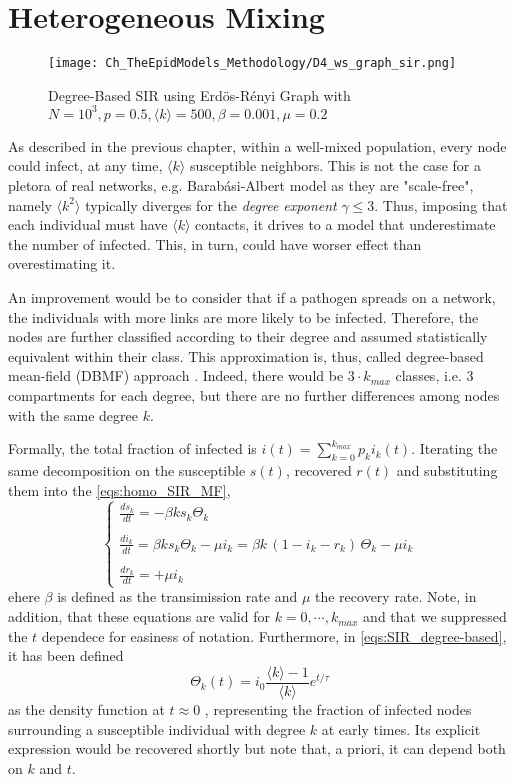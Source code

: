 \documentclass[a4paper,10pt,twoside]{book} %
\theoremstyle{definition}
\begin{document}
\newpage
\section{Heterogeneous Mixing}
\label{sec:degree-basedMF}
\begin{figure}[ht]
	\texttt{[image: Ch\_TheEpidModels\_Methodology/D4\_ws\_graph\_sir.png]}
	\caption{Degree-Based SIR using Erdös-Rényi Graph with $N = 10^{3}, p = 0.5, \langle k \rangle = 500, \beta = 0.001,  \mu = 0.2$}
	\label{fig:DB_SIR}
\end{figure}
As described in the previous chapter, within a well-mixed population, every node could infect, at any time, $\langle k \rangle$ susceptible neighbors. This is not the case for a pletora of real networks, e.g. Barabási-Albert model as they are "scale-free", namely $\langle k^2 \rangle$ typically diverges for the \textit{degree exponent} $\gamma \leq 3$. Thus, imposing that each individual must have $\langle k \rangle$ contacts, it drives to a model that underestimate the number of infected. This, in turn, could have worser effect than overestimating it.

An improvement would be to consider that if a pathogen spreads on a network, the individuals with more links are more likely to be infected. Therefore, the nodes are further classified according to their degree and assumed statistically equivalent within their class. This approximation is, thus, called degree-based mean-field (DBMF) approach \cite{barabasi::2016networkbook}. Indeed, there would be $3 \cdot k_{max}$ classes, i.e. $3$ compartments for each degree, but there are no further differences among nodes with the same degree $k$. 

Formally, the total fraction of infected is $i(t) = \sum_{k=0}^{k_{max}} p_k i_k(t)$. Iterating the same decomposition on the susceptible $ s(t)$, recovered $ r(t)$ and substituting them into the \autoref{eqs:homo_SIR_MF},
\begin{equation}
	\begin{cases}
		\frac{ds_k}{dt} = -\beta  k  s_k \Theta_k \\ \\ 
		\frac{di_k}{dt} = \beta  k  s_k \Theta_k - \mu i_k = \beta  k  \, (1-i_k-r_k) \, \Theta_k -\mu i_k \label{eqs:SIR_degree-based} \\ \\
		\frac{dr_k}{dt} = +\mu i_k
	\end{cases}	
\end{equation}
ehere $ \beta$ is defined as the transimission rate and $ \mu$ the recovery rate.
Note, in addition, that these equations are valid for $k = 0,\cdots,k_{max}$ and that we suppressed the $t$ dependece for easiness of notation.
Furthermore, in \autoref{eqs:SIR_degree-based}, it has been defined
\begin{equation}
	\Theta_k(t) = i_0 \frac{\langle k \rangle - 1}{\langle k \rangle} e^{t/\tau}
\end{equation}
as the density function at $ t \approx 0$ , representing the fraction of infected nodes surrounding a susceptible individual with degree $k$ at early times. Its explicit expression would be recovered shortly but note that, a priori, it can depend both on $k$ and $t$.
\end{document}
